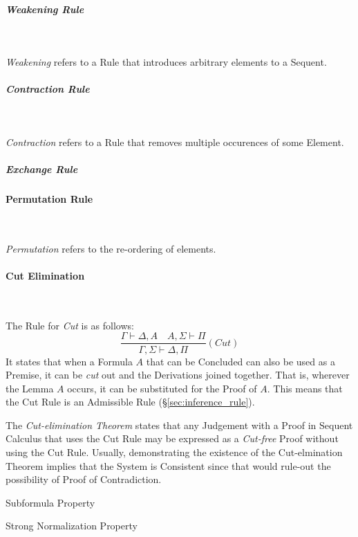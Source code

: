 \subparagraph{Weakening Rule}\label{sec:weakening_rule} \hfill \\\hfill

\emph{Weakening} refers to a Rule that introduces arbitrary elements
to a Sequent.



\subparagraph{Contraction Rule}\label{sec:contraction_rule} \hfill \\\hfill

\emph{Contraction} refers to a Rule that removes
multiple occurences of some Element.



\subparagraph{Exchange Rule}\label{sec:exchange_rule}\hfill



\paragraph{Permutation Rule}\label{sec:permutation_rule} \hfill \\\hfill

\emph{Permutation} refers to the re-ordering of elements.



\paragraph{Cut Elimination}\label{sec:cut_elimination} \hfill \\\hfill

The Rule for \emph{Cut} is as follows:
\[
  \frac{
    \Gamma \vdash \Delta, A \quad A, \Sigma \vdash \Pi
  }{
    \Gamma, \Sigma \vdash \Delta, \Pi
  }(Cut)
\]
It states that when a Formula $A$ that can be Concluded can also be
used as a Premise, it can be \emph{cut} out and the Derivations joined
together. That is, wherever the Lemma $A$ occurs, it can be
substituted for the Proof of $A$. This means that the Cut Rule is an
Admissible Rule (\S\ref{sec:inference_rule}).

The \emph{Cut-elimination Theorem} states that any Judgement with a
Proof in Sequent Calculus that uses the Cut Rule may be expressed as a
\emph{Cut-free} Proof without using the Cut Rule. Usually,
demonstrating the existence of the Cut-elmination Theorem implies that
the System is Consistent since that would rule-out the possibility of
Proof of Contradiction.

Subformula Property %

Strong Normalization Property

